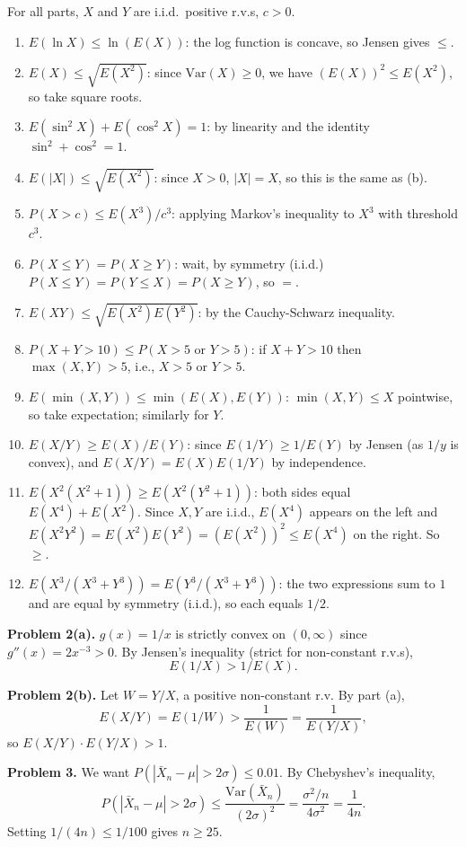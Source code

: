\documentclass{article}
\begin{document}
For all parts, $X$ and $Y$ are i.i.d.\ positive r.v.s, $c>0$.

\begin{enumerate}
\item[(a)] $E(\ln X)\le\ln(E(X))$: the log function is concave, so Jensen gives $\le$.
\item[(b)] $E(X)\le\sqrt{E(X^2)}$: since $\text{Var}(X)\ge0$, we have $(E(X))^2\le E(X^2)$, so take square roots.
\item[(c)] $E(\sin^2 X)+E(\cos^2 X)=1$: by linearity and the identity $\sin^2+\cos^2=1$.
\item[(d)] $E(|X|)\le\sqrt{E(X^2)}$: since $X>0$, $|X|=X$, so this is the same as (b).
\item[(e)] $P(X>c)\le E(X^3)/c^3$: applying Markov's inequality to $X^3$ with threshold $c^3$.
\item[(f)] $P(X\le Y)=P(X\ge Y)$: wait, by symmetry (i.i.d.) $P(X\le Y)=P(Y\le X)=P(X\ge Y)$, so $=$.
\item[(g)] $E(XY)\le\sqrt{E(X^2)E(Y^2)}$: by the Cauchy-Schwarz inequality.
\item[(h)] $P(X+Y>10)\le P(X>5\text{ or }Y>5)$: if $X+Y>10$ then $\max(X,Y)>5$, i.e., $X>5$ or $Y>5$.
\item[(i)] $E(\min(X,Y))\le\min(E(X),E(Y))$: $\min(X,Y)\le X$ pointwise, so take expectation; similarly for $Y$.
\item[(j)] $E(X/Y)\ge E(X)/E(Y)$: since $E(1/Y)\ge1/E(Y)$ by Jensen (as $1/y$ is convex), and $E(X/Y)=E(X)E(1/Y)$ by independence.
\item[(k)] $E(X^2(X^2+1))\ge E(X^2(Y^2+1))$: both sides equal $E(X^4)+E(X^2)$. Since $X,Y$ are i.i.d., $E(X^4)$ appears on the left and $E(X^2Y^2)=E(X^2)E(Y^2)=(E(X^2))^2\le E(X^4)$ on the right. So $\ge$.
\item[(l)] $E(X^3/(X^3+Y^3))=E(Y^3/(X^3+Y^3))$: the two expressions sum to $1$ and are equal by symmetry (i.i.d.), so each equals $1/2$.
\end{enumerate}

\bigskip
\textbf{Problem 2(a).} $g(x)=1/x$ is strictly convex on $(0,\infty)$ since $g''(x)=2x^{-3}>0$. By Jensen's inequality (strict for non-constant r.v.s),
$$
E(1/X)>1/E(X).
$$

\textbf{Problem 2(b).} Let $W=Y/X$, a positive non-constant r.v. By part (a),
$$
E(X/Y)=E(1/W)>\frac{1}{E(W)}=\frac{1}{E(Y/X)},
$$
so $E(X/Y)\cdot E(Y/X)>1$.

\bigskip
\textbf{Problem 3.} We want $P(|\bar X_n-\mu|>2\sigma)\le0.01$. By Chebyshev's inequality,
$$
P(|\bar X_n-\mu|>2\sigma)\le\frac{\text{Var}(\bar X_n)}{(2\sigma)^2}=\frac{\sigma^2/n}{4\sigma^2}=\frac{1}{4n}.
$$
Setting $1/(4n)\le1/100$ gives $n\ge25$.
\end{document}
